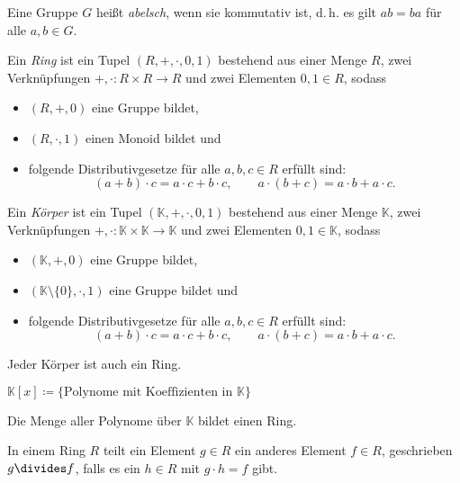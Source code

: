 \documentclass{cheat-sheet}
\newcommand{\K}{\mathbb{K}} %
\begin{document}
\begin{defn}
  Eine Gruppe $G$ heißt \emph{abelsch}, wenn sie kommutativ ist, d.\,h. es gilt $ab = ba$ für alle $a, b \in G$.
\end{defn}

\begin{defn}
  Ein \emph{Ring} ist ein Tupel $(R, +, \cdot, 0, 1)$ bestehend aus einer Menge $R$, zwei Verknüpfungen $+, \cdot : R \times R \to R$ und zwei Elementen $0, 1 \in R$, sodass
  \begin{itemize}
    \item $(R, +, 0)$ eine Gruppe bildet,
    \item $(R, \cdot, 1)$ einen Monoid bildet und
    \item folgende Distributivgesetze für alle $a, b, c \in R$ erfüllt sind:
    \[
      (a + b) \cdot c = a \cdot c + b \cdot c, \qquad
      a \cdot (b + c) = a \cdot b + a \cdot c.
    \]
  \end{itemize}
\end{defn}

\begin{defn}
  Ein \emph{Körper} ist ein Tupel $(\K, +, \cdot, 0, 1)$ bestehend aus einer Menge $\K$, zwei Verknüpfungen $+, \cdot : \K \times \K \to \K$ und zwei Elementen $0, 1 \in \K$, sodass
  \begin{itemize}
    \item $(\K, +, 0)$ eine Gruppe bildet,
    \item $(\K \setminus \{ 0 \}, \cdot, 1)$ eine Gruppe bildet und
    \item folgende Distributivgesetze für alle $a, b, c \in R$ erfüllt sind:
    \[
      (a + b) \cdot c = a \cdot c + b \cdot c, \qquad
      a \cdot (b + c) = a \cdot b + a \cdot c.
    \]
  \end{itemize}
\end{defn}

\begin{bem}
  Jeder Körper ist auch ein Ring.
\end{bem}

\begin{nota}
  $\K[x] \coloneqq \{ \text{Polynome mit Koeffizienten in $\K$} \}$
\end{nota}

\begin{bem}
  Die Menge aller Polynome über $\K$ bildet einen Ring.
\end{bem}

\begin{defn}
  In einem Ring $R$ teilt ein Element $g \in R$ ein anderes Element $f \in R$, geschrieben $g \divides f$, falls es ein $h \in R$ mit $g \cdot h = f$ gibt.
\end{defn}
\end{document}
